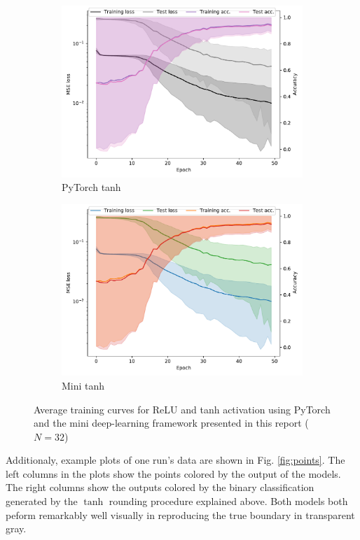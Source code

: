 \documentclass[prl, article, twocolumn]{revtex4-1}
\begin{document}
\begin{figure}[h!]
\begin{subfigure}[]{0.45\linewidth}
        \includegraphics[width=\textwidth]{figures/pytorch/tanh_history.pdf}
        \caption{PyTorch tanh}
    \end{subfigure}
    \begin{subfigure}[]{0.45\linewidth}
        \includegraphics[width=\textwidth]{figures/mini/tanh_history.pdf}
        \caption{Mini tanh}
    \end{subfigure}
    \caption{Average training curves for ReLU and tanh activation using PyTorch and the mini deep-learning framework presented in this report ($N=32$)}
    \label{fig:training}
\end{figure}

Additionaly, example plots of one run's data are shown in Fig. \ref{fig:points}. The left columns in the plots show the points colored by the output of the models. The right columns show the outputs colored by the binary classification generated by the $\tanh$ rounding procedure explained above. Both models both peform remarkably well visually in reproducing the true boundary in transparent gray.
\end{document}
